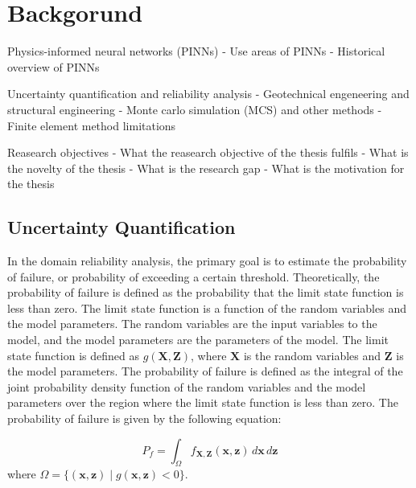 \chapter{Backgorund}
\label{ch:background}

Physics-informed neural networks (PINNs)
- Use areas of PINNs
- Historical overview of PINNs



Uncertainty quantification and reliability analysis
- Geotechnical engeneering and structural engineering
- Monte carlo simulation (MCS) and other methods
- Finite element method limitations 

Reasearch objectives
- What the reasearch objective of the thesis fulfils
- What is the novelty of the thesis
- What is the research gap
- What is the motivation for the thesis


\section{Uncertainty Quantification}

In the domain reliability analysis, the primary goal is to estimate the probability of failure, or probability of exceeding a certain threshold. Theoretically, the probability of failure is defined as the probability that the limit state function is less than zero. The limit state function is a function of the random variables and the model parameters. The random variables are the input variables to the model, and the model parameters are the parameters of the model. The limit state function is defined as $g(\mathbf{X}, \mathbf{Z})$, where $\mathbf{X}$ is the random variables and $\mathbf{Z}$ is the model parameters. The probability of failure is defined as the integral of the joint probability density function of the random variables and the model parameters over the region where the limit state function is less than zero. The probability of failure is given by the following equation: 

\begin{equation}
P_f = \int_{\Omega} f_{\mathbf{X}, \mathbf{Z}}(\mathbf{x}, \mathbf{z}) \, d\mathbf{x} \, d\mathbf{z}
\end{equation}
where $\Omega = \{ (\mathbf{x}, \mathbf{z}) \mid g(\mathbf{x}, \mathbf{z}) < 0 \}$.

